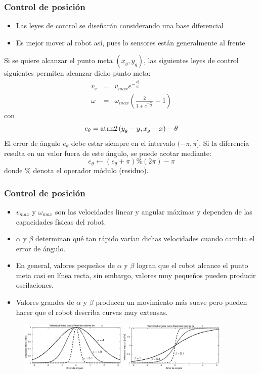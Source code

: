 \begin{frame}\frametitle{Control de posición}
  \begin{itemize}
  \item Las leyes de control se diseñarán considerando una base diferencial
  \item Es mejor mover al robot así, pues lo sensores están generalmente al frente
  \end{itemize}
  Si se quiere alcanzar el punto meta $(x_g, y_g)$, las siguientes leyes de control siguientes permiten alcanzar dicho punto meta:
  \begin{eqnarray*}
  v_x    &=& v_{max}e^{-\frac{e_{\theta}^{2}}{\alpha}}\label{eq:Control11}\\
  \omega &=& \omega_{max}\left(\frac{2}{1+e^{-\frac{e_{\theta}}{\beta}}}-1\right)\label{eq:Control12}
  \end{eqnarray*}
  con
  \[e_{\theta} = \operatorname{atan2}\left(y_g - y, x_g - x\right) - \theta\]
  El error de ángulo $e_\theta$ debe estar siempre en el intervalo $(-\pi, \pi]$. Si la diferencia resulta en un valor fuera de este ángulo, se puede acotar mediante:
  \[e_\theta \leftarrow \left(e_\theta + \pi\right)\% (2\pi) - \pi\]
  donde \% denota el operador módulo (residuo). 
\end{frame}

\begin{frame}\frametitle{Control de posición}
  \begin{itemize}
  \item $v_{max}$ y $\omega_{max}$ son las velocidades linear y angular máximas y dependen de las capacidades físicas del robot.
  \item $\alpha$ y $\beta$ determinan qué tan rápido varían dichas velocidades cuando cambia el error de ángulo.
  \item En general, valores pequeños de $\alpha$ y $\beta$ logran que el robot alcance el punto meta casi en línea recta, sin embargo, valores muy pequeños pueden producir oscilaciones.
  \item Valores grandes de $\alpha$ y $\beta$ producen un movimiento más suave pero pueden hacer que el robot describa curvas muy extensas. 
  \end{itemize}
  \begin{figure}
    \centering
    \includegraphics[width=0.45\textwidth]{Figures/LinearSpeed.eps}
    \includegraphics[width=0.45\textwidth]{Figures/AngularSpeed.eps}
  \end{figure}
\end{frame}

